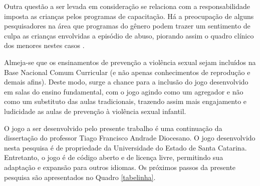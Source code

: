 

\pagebreak

Outra questão a ser levada em consideração se relaciona com a responsabilidade imposta as crianças pelos programas de capacitação. Há a preocupação de alguns pesquisadores na área que programas do gênero podem trazer um sentimento de culpa as crianças envolvidas a episódio de abuso, piorando assim o quadro clínico dos menores nestes casos \cite{finkelhor2009prevention}. %

Almeja-se que os ensinamentos de prevenção a violência sexual sejam incluídos na Base Nacional Comum Curricular (e não apenas conhecimentos de reprodução e demais afins). Deste modo, surge a chance para a inclusão do jogo desenvolvido em salas do ensino fundamental, com o jogo agindo como um agregador e não como um substituto das aulas tradicionais, trazendo assim mais engajamento e ludicidade as aulas de prevenção à violência sexual infantil.
   

O jogo a ser desenvolvido pelo presente trabalho é uma continuação da dissertação do professor Tiago Francisco Andrade Diocesano. %
O jogo desenvolvido nesta pesquisa é de propriedade da Universidade do Estado de Santa Catarina. Entretanto, o jogo é de código aberto e de licença livre, permitindo sua adaptação e expansão para outros idiomas. Os próximos passos da presente pesquisa são apresentados no Quadro \ref{tabelinha}.

